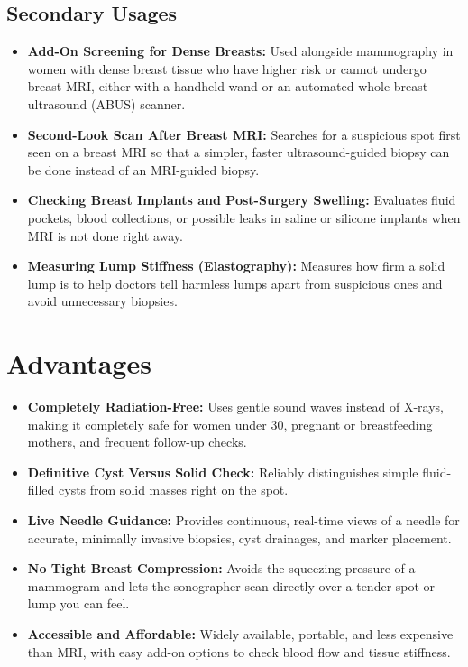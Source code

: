 \subsection{Secondary Usages}
\begin{itemize}
\item \textbf{Add-On Screening for Dense Breasts:} Used alongside mammography in women with dense breast tissue who have higher risk or cannot undergo breast MRI, either with a handheld wand or an automated whole-breast ultrasound (ABUS) scanner.
\item \textbf{Second-Look Scan After Breast MRI:} Searches for a suspicious spot first seen on a breast MRI so that a simpler, faster ultrasound-guided biopsy can be done instead of an MRI-guided biopsy.
\item \textbf{Checking Breast Implants and Post-Surgery Swelling:} Evaluates fluid pockets, blood collections, or possible leaks in saline or silicone implants when MRI is not done right away.
\item \textbf{Measuring Lump Stiffness (Elastography):} Measures how firm a solid lump is to help doctors tell harmless lumps apart from suspicious ones and avoid unnecessary biopsies.
\end{itemize}

\section{Advantages}
\begin{itemize}
\item \textbf{Completely Radiation-Free:} Uses gentle sound waves instead of X-rays, making it completely safe for women under 30, pregnant or breastfeeding mothers, and frequent follow-up checks.
\item \textbf{Definitive Cyst Versus Solid Check:} Reliably distinguishes simple fluid-filled cysts from solid masses right on the spot.
\item \textbf{Live Needle Guidance:} Provides continuous, real-time views of a needle for accurate, minimally invasive biopsies, cyst drainages, and marker placement.
\item \textbf{No Tight Breast Compression:} Avoids the squeezing pressure of a mammogram and lets the sonographer scan directly over a tender spot or lump you can feel.
\item \textbf{Accessible and Affordable:} Widely available, portable, and less expensive than MRI, with easy add-on options to check blood flow and tissue stiffness.
\end{itemize}

